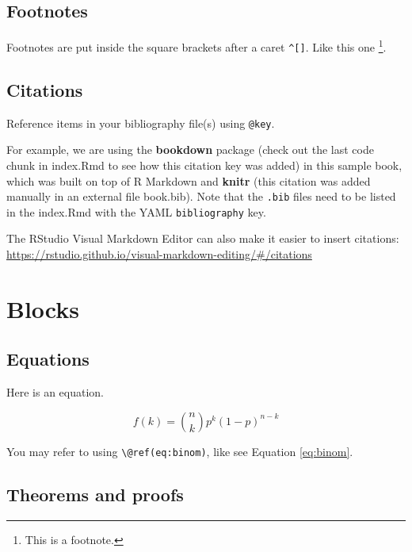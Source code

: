 \documentclass[
]{book}
\theoremstyle{definition}
\theoremstyle{definition}
\theoremstyle{definition}
\theoremstyle{definition}
\theoremstyle{remark}
\begin{document}
\hypertarget{footnotes}{%
\section{Footnotes}\label{footnotes}}

Footnotes are put inside the square brackets after a caret \texttt{\^{}{[}{]}}. Like this one \footnote{This is a footnote.}.

\hypertarget{citations}{%
\section{Citations}\label{citations}}

Reference items in your bibliography file(s) using \texttt{@key}.

For example, we are using the \textbf{bookdown} package \citep{R-bookdown} (check out the last code chunk in index.Rmd to see how this citation key was added) in this sample book, which was built on top of R Markdown and \textbf{knitr} \citep{xie2015} (this citation was added manually in an external file book.bib).
Note that the \texttt{.bib} files need to be listed in the index.Rmd with the YAML \texttt{bibliography} key.

The RStudio Visual Markdown Editor can also make it easier to insert citations: \url{https://rstudio.github.io/visual-markdown-editing/\#/citations}

\hypertarget{blocks}{%
\chapter{Blocks}\label{blocks}}

\hypertarget{equations}{%
\section{Equations}\label{equations}}

Here is an equation.

\begin{equation} 
  f\left(k\right) = \binom{n}{k} p^k\left(1-p\right)^{n-k}
  \label{eq:binom}
\end{equation}

You may refer to using \texttt{\textbackslash{}@ref(eq:binom)}, like see Equation \eqref{eq:binom}.

\hypertarget{theorems-and-proofs}{%
\section{Theorems and proofs}\label{theorems-and-proofs}}
\end{document}

